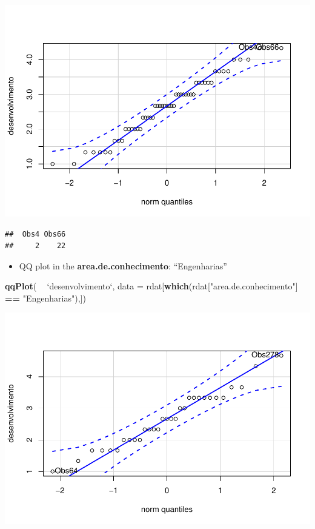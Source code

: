 \documentclass[]{article}
\newenvironment{Shaded}{\begin{snugshade}}{\end{snugshade}}
\newcommand{\DataTypeTok}[1]{\textcolor[rgb]{0.13,0.29,0.53}{#1}}
\newcommand{\KeywordTok}[1]{\textcolor[rgb]{0.13,0.29,0.53}{\textbf{#1}}}
\newcommand{\NormalTok}[1]{#1}
\newcommand{\OperatorTok}[1]{\textcolor[rgb]{0.81,0.36,0.00}{\textbf{#1}}}
\newcommand{\StringTok}[1]{\textcolor[rgb]{0.31,0.60,0.02}{#1}}
\providecommand{\tightlist}{%
  \setlength{\itemsep}{0pt}\setlength{\parskip}{0pt}}
\begin{document}
\includegraphics{factorialAnova_files/figure-latex/unnamed-chunk-14-1.pdf}

\begin{verbatim}
##  Obs4 Obs66 
##     2    22
\end{verbatim}

\begin{itemize}
\tightlist
\item
  QQ plot in the \textbf{area.de.conhecimento}: ``Engenharias''
\end{itemize}

\begin{Shaded}
\begin{Highlighting}[]
\KeywordTok{qqPlot}\NormalTok{( }\OperatorTok{~}\StringTok{ `}\DataTypeTok{desenvolvimento}\StringTok{`}\NormalTok{, }\DataTypeTok{data =}\NormalTok{ rdat[}\KeywordTok{which}\NormalTok{(rdat[}\StringTok{"area.de.conhecimento"}\NormalTok{] }\OperatorTok{==}\StringTok{ "Engenharias"}\NormalTok{),])}
\end{Highlighting}
\end{Shaded}

\includegraphics{factorialAnova_files/figure-latex/unnamed-chunk-15-1.pdf}
\end{document}
